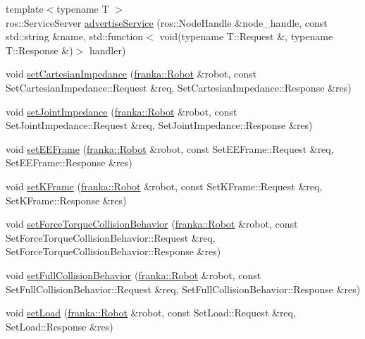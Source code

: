\begin{DoxyCompactItemize}
\item 
{\footnotesize template$<$typename T $>$ }\\ros\+::\+Service\+Server \hyperlink{namespacefranka__control_ad9a13c60c284e90d4a1663071e5e1f33}{advertise\+Service} (ros\+::\+Node\+Handle \&node\+\_\+handle, const std\+::string \&name, std\+::function$<$ void(typename T\+::\+Request \&, typename T\+::\+Response \&)$>$ handler)
\item 
void \hyperlink{namespacefranka__control_a6c82cc16e5790da8663f879332670421}{set\+Cartesian\+Impedance} (\hyperlink{classfranka_1_1Robot}{franka\+::\+Robot} \&robot, const Set\+Cartesian\+Impedance\+::\+Request \&req, Set\+Cartesian\+Impedance\+::\+Response \&res)
\item 
void \hyperlink{namespacefranka__control_a38bda5f02b38367b199e8599993994ca}{set\+Joint\+Impedance} (\hyperlink{classfranka_1_1Robot}{franka\+::\+Robot} \&robot, const Set\+Joint\+Impedance\+::\+Request \&req, Set\+Joint\+Impedance\+::\+Response \&res)
\item 
void \hyperlink{namespacefranka__control_aaab1e3e96b01a8589336c39998422dad}{set\+E\+E\+Frame} (\hyperlink{classfranka_1_1Robot}{franka\+::\+Robot} \&robot, const Set\+E\+E\+Frame\+::\+Request \&req, Set\+E\+E\+Frame\+::\+Response \&res)
\item 
void \hyperlink{namespacefranka__control_a733bf6cd47763b70eaf44b7b5a237af9}{set\+K\+Frame} (\hyperlink{classfranka_1_1Robot}{franka\+::\+Robot} \&robot, const Set\+K\+Frame\+::\+Request \&req, Set\+K\+Frame\+::\+Response \&res)
\item 
void \hyperlink{namespacefranka__control_a7ea982d94110cc6f522d42a140d608af}{set\+Force\+Torque\+Collision\+Behavior} (\hyperlink{classfranka_1_1Robot}{franka\+::\+Robot} \&robot, const Set\+Force\+Torque\+Collision\+Behavior\+::\+Request \&req, Set\+Force\+Torque\+Collision\+Behavior\+::\+Response \&res)
\item 
void \hyperlink{namespacefranka__control_a13e02b7048c013bf57506f927ce6745d}{set\+Full\+Collision\+Behavior} (\hyperlink{classfranka_1_1Robot}{franka\+::\+Robot} \&robot, const Set\+Full\+Collision\+Behavior\+::\+Request \&req, Set\+Full\+Collision\+Behavior\+::\+Response \&res)
\item 
void \hyperlink{namespacefranka__control_a3fbd42b0a097186b01181eb159ef1785}{set\+Load} (\hyperlink{classfranka_1_1Robot}{franka\+::\+Robot} \&robot, const Set\+Load\+::\+Request \&req, Set\+Load\+::\+Response \&res)
\end{DoxyCompactItemize}


